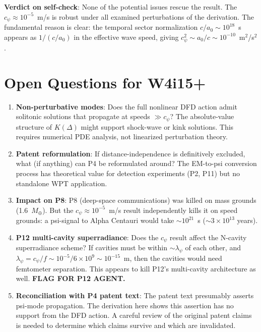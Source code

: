\documentclass[11pt]{article}
\newcommand{\ee}[1]{\times 10^{#1}}
\begin{document}
\textbf{Verdict on self-check}: None of the potential issues rescue the
result. The $c_\psi \approx 10^{-5}$~m/s is robust under all examined
perturbations of the derivation. The fundamental reason is clear: the
temporal sector normalization $c/a_0 \sim 10^{18}$~s appears as
$1/(c/a_0)$ in the effective wave speed, giving
$c_\psi^2 \sim a_0/c \sim 10^{-10}$~m$^2$/s$^2$.

\section{Open Questions for W4i15+}

\begin{enumerate}
\item \textbf{Non-perturbative modes}: Does the full nonlinear DFD
  action admit solitonic solutions that propagate at speeds $\gg c_\psi$?
  The absolute-value structure of $K(\Delta)$ might support shock-wave
  or kink solutions. This requires numerical PDE analysis, not
  linearized perturbation theory.

\item \textbf{Patent reformulation}: If distance-independence is
  definitively excluded, what (if anything) can P4 be reformulated
  around? The EM-to-psi conversion process has theoretical value for
  detection experiments (P2, P11) but no standalone WPT application.

\item \textbf{Impact on P8}: P8 (deep-space communications) was killed
  on mass grounds (1.6~$M_\oplus$). But the $c_\psi \approx 10^{-5}$~m/s
  result independently kills it on speed grounds: a psi-signal to
  Alpha Centauri would take $\sim 10^{21}$~s ($\sim 3\ee{13}$ years).

\item \textbf{P12 multi-cavity superradiance}: Does the $c_\psi$
  result affect the N-cavity superradiance scheme? If cavities must
  be within $\sim\lambda_\psi$ of each other, and $\lambda_\psi =
  c_\psi/f \sim 10^{-5}/6\ee{9} \sim 10^{-15}$~m, then the cavities
  would need femtometer separation. This appears to kill P12's
  multi-cavity architecture as well. \textbf{FLAG FOR P12 AGENT.}

\item \textbf{Reconciliation with P4 patent text}: The patent text
  presumably asserts psi-mode propagation. The derivation here shows
  this assertion has no support from the DFD action. A careful review
  of the original patent claims is needed to determine which claims
  survive and which are invalidated.
\end{enumerate}
\end{document}
